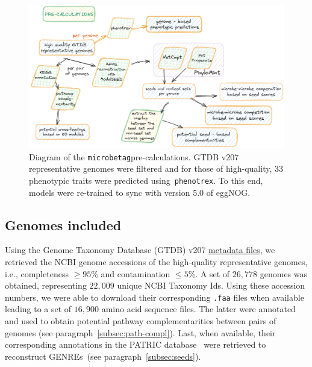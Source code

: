 \documentclass[sn-mathphys,Numbered]{sn-jnl}  %
\theoremstyle{thmstyleone}%
\theoremstyle{thmstyletwo}%
\theoremstyle{thmstylethree}%
\newcommand{\microbetag}{\texttt{microbetag}}
\begin{document}
    \begin{figure}[h!]
        \label{fig:precalc}
        \includegraphics[width=0.9\columnwidth]{figs/microbetag-precal.png}
        \caption{
            Diagram of the \microbetag pre-calculations.
            GTDB v207 representative genomes were filtered and for those of high-quality,
            33 phenotypic traits were predicted using~\texttt{phenotrex}.
            To this end, models were re-trained to sync with version 5.0 of eggNOG.
        }
    \end{figure}


    \subsection*{Genomes included}
    \label{subsec:genomes}

        Using the Genome Taxonomy Database (GTDB) v207 \href{https://data.gtdb.ecogenomic.org/releases/release207/207.0/}{metadata files}, we retrieved the NCBI genome accessions of the high-quality representative genomes, i.e., completeness $\geq 95\%$  and contamination $\leq 5\%$.
        A set of $26,778$ genomes was obtained, representing $22,009$ unique NCBI Taxonomy Ids.
        Using these accession numbers, we were able to download their corresponding \texttt{.faa} files when available 
        leading to a set of $16,900$ amino acid sequence files.
        The latter were annotated and used to obtain potential pathway complementarities between pairs of genomes (see paragraph~\ref{subsec:path-compl}).
        Last, when available, their corresponding annotations in the PATRIC database~\cite{wattam2017improvements} were retrieved to reconstruct GENREs~(see paragraph~\ref{subsec:seeds}).
\end{document}
